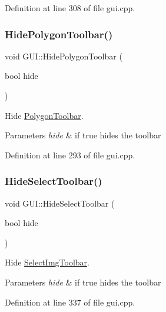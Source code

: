 Definition at line 308 of file gui.\+cpp.

\mbox{\label{classGUI_aaf633cd0904e4c3627c21219f330c177}} 
\subsubsection{\texorpdfstring{Hide\+Polygon\+Toolbar()}{HidePolygonToolbar()}}
{\footnotesize\ttfamily void G\+U\+I\+::\+Hide\+Polygon\+Toolbar (\begin{DoxyParamCaption}\item[{bool}]{hide }\end{DoxyParamCaption})}



Hide \mbox{\hyperlink{structPolygonToolbar}{Polygon\+Toolbar}}. 


\begin{DoxyParams}{Parameters}
{\em hide} & if true hides the toolbar \\
\hline
\end{DoxyParams}


Definition at line 293 of file gui.\+cpp.

\mbox{\label{classGUI_a7f6d3b1fcbd874fccd93c5f29c468ed8}} 
\subsubsection{\texorpdfstring{Hide\+Select\+Toolbar()}{HideSelectToolbar()}}
{\footnotesize\ttfamily void G\+U\+I\+::\+Hide\+Select\+Toolbar (\begin{DoxyParamCaption}\item[{bool}]{hide }\end{DoxyParamCaption})}



Hide \mbox{\hyperlink{structSelectImgToolbar}{Select\+Img\+Toolbar}}. 


\begin{DoxyParams}{Parameters}
{\em hide} & if true hides the toolbar \\
\hline
\end{DoxyParams}


Definition at line 337 of file gui.\+cpp.

